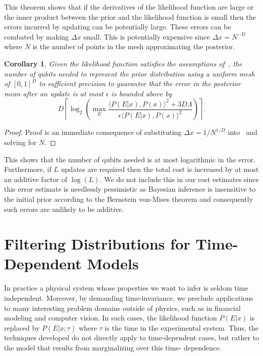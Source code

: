 \documentclass[aps,amsmath,onecolumn,amssymb,notitlepage]{revtex4-1}
\newtheorem{corollary}{Corollary}
\begin{document}
This theorem shows that if the derivatives of the likelihood function are large or the inner product between the prior and the likelihood function is small then the errors incurred by updating can be potentially large.  These errors can be combated by making $\Delta x$ small.  This is potentially expensive since $\Delta x = N^{-D}$ where $N$ is the number of points in the mesh approximating the posterior.

\begin{corollary}
Given the likelihood function satisfies the assumptions of~, the number of qubits needed to represent the prior distribution using a uniform mesh of $[0,1]^D$ to sufficient precision to guarantee that the error in the posterior mean after an update is at most $\epsilon$ is bounded above by
$$
D \left\lceil\log_2\left(\max_E \frac{\langle P(E|x),P(x)\rangle^2+3{D} \Lambda}{\epsilon \langle P(E|x),P(x)\rangle^2}
\right) \right\rceil.
$$
\end{corollary}
\begin{proof}
Proof is an immediate consequence of substituting $\Delta x =1/N^{1/D}$ into~ and solving for $N$.
\end{proof}
This shows that the number of qubits needed is at most logarithmic in the error.  Furthermore, if $L$ updates are required then the total cost is increased by at most an additive factor of $\log(L)$.  We do not include this in our cost estimates since this error estimate is needlessly pessimistic as Bayesian inference is insensitive to the initial prior according to the Bernstein von-Mises theorem and consequently such errors are unlikely to be additive.




\section{Filtering Distributions for Time-Dependent Models}
\label{app:time-dep}

In practice a physical system whose properties we want to infer is seldom time
independent. Moreover, by demanding time-invariance, we preclude applications
to many interesting problem domains outside of physics, such as in financial
modeling and computer vision. In such cases, the likelihood function $P(E|x)$
is replaced by $P(E|x;\tau)$ where $\tau$ is the time in the experimental
system. Thus, the techniques developed do not directly apply to time-dependent
cases, but rather to the model that results from marginalizing over this time-
dependence.
\end{document}
